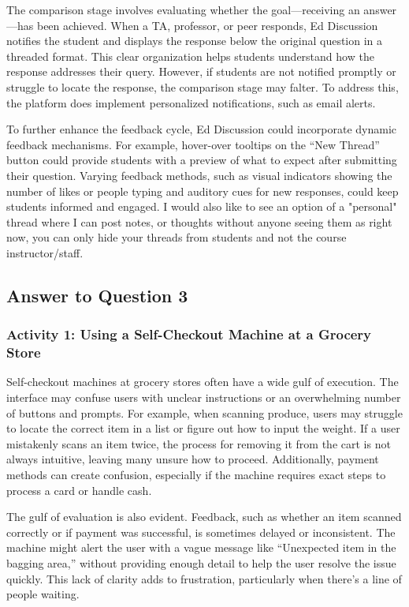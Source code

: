 \documentclass[
	letterpaper, %
]{jdf}
\begin{document}
The comparison stage involves evaluating whether the goal—receiving an answer—has been achieved. When a TA, professor, or peer responds, Ed Discussion notifies the student and displays the response below the original question in a threaded format. This clear organization helps students understand how the response addresses their query. However, if students are not notified promptly or struggle to locate the response, the comparison stage may falter. To address this, the platform does implement personalized notifications, such as email alerts.

To further enhance the feedback cycle, Ed Discussion could incorporate dynamic feedback mechanisms. For example, hover-over tooltips on the “New Thread” button could provide students with a preview of what to expect after submitting their question. Varying feedback methods, such as visual indicators showing the number of likes or people typing and auditory cues for new responses, could keep students informed and engaged. I would also like to see an option of a "personal" thread where I can post notes, or thoughts without anyone seeing them as right now, you can only hide your threads from students and not the course instructor/staff. 
\newpage

\subsection{Answer to Question 3}
\subsubsection {Activity 1: Using a Self-Checkout Machine at a Grocery Store}
Self-checkout machines at grocery stores often have a wide gulf of execution. The interface may confuse users with unclear instructions or an overwhelming number of buttons and prompts. For example, when scanning produce, users may struggle to locate the correct item in a list or figure out how to input the weight. If a user mistakenly scans an item twice, the process for removing it from the cart is not always intuitive, leaving many unsure how to proceed. Additionally, payment methods can create confusion, especially if the machine requires exact steps to process a card or handle cash.

The gulf of evaluation is also evident. Feedback, such as whether an item scanned correctly or if payment was successful, is sometimes delayed or inconsistent. The machine might alert the user with a vague message like “Unexpected item in the bagging area,” without providing enough detail to help the user resolve the issue quickly. This lack of clarity adds to frustration, particularly when there’s a line of people waiting.
\end{document}
